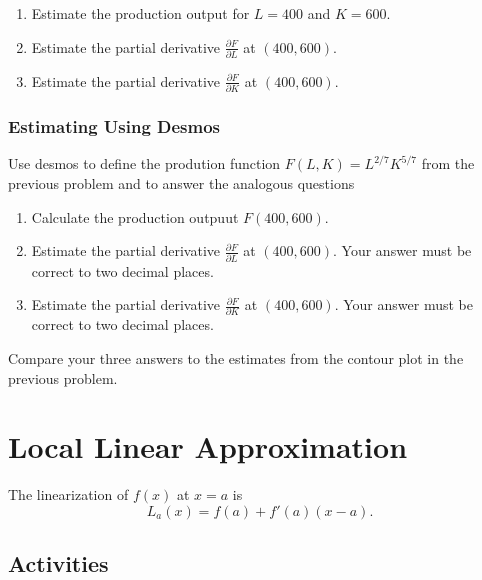 \documentclass[
]{book}
\providecommand{\tightlist}{%
  \setlength{\itemsep}{0pt}\setlength{\parskip}{0pt}}
\begin{document}
\begin{enumerate}
\def\labelenumi{\arabic{enumi}.}
\tightlist
\item
  Estimate the production output for \(L=400\) and \(K=600\).
\item
  Estimate the partial derivative \(\displaystyle{\frac{\partial F}{\partial L}}\) at \((400,600)\).
\item
  Estimate the partial derivative \(\displaystyle{\frac{\partial F}{\partial K}}\) at \((400,600)\).
\end{enumerate}

\hypertarget{estimating-using-desmos}{%
\subsection{Estimating Using Desmos}\label{estimating-using-desmos}}

Use desmos to define the prodution function \(F(L,K) = L^{2/7} K^{5/7}\) from the previous problem and to answer the analogous questions

\begin{enumerate}
\def\labelenumi{\arabic{enumi}.}
\tightlist
\item
  Calculate the production outpuut \(F(400,600)\).
\item
  Estimate the partial derivative \(\displaystyle{\frac{\partial F}{\partial L}}\) at \((400,600)\). Your answer must be correct to two decimal places.
\item
  Estimate the partial derivative \(\displaystyle{\frac{\partial F}{\partial K}}\) at \((400,600)\).
  Your answer must be correct to two decimal places.
\end{enumerate}

Compare your three answers to the estimates from the contour plot in the previous problem.

\hypertarget{local-linear-approximation}{%
\chapter{Local Linear Approximation}\label{local-linear-approximation}}

The linearization of \(f(x)\) at \(x=a\) is
\[
L_a(x) = f(a) + f'(a) (x-a).
\]

\hypertarget{activities-13}{%
\section{Activities}\label{activities-13}}
\end{document}
